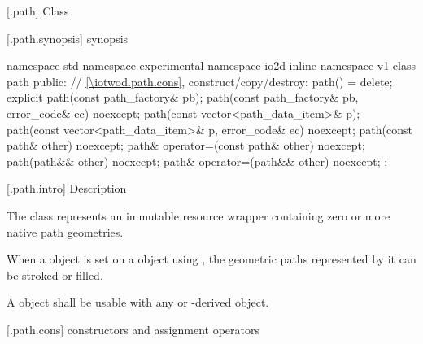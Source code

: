  [\iotwod.path] {Class }

 [\iotwod.path.synopsis] { synopsis}

\begin{codeblock}
namespace std { namespace experimental { namespace io2d { inline namespace v1 {
  class path {
    public:
    // \ref{\iotwod.path.cons}, construct/copy/destroy:
    path() = delete;
    explicit path(const path_factory& pb);
    path(const path_factory& pb, error_code& ec) noexcept;
    path(const vector<path_data_item>& p);
    path(const vector<path_data_item>& p, error_code& ec) noexcept;
    path(const path& other) noexcept;
    path& operator=(const path& other) noexcept;
    path(path&& other) noexcept;
    path& operator=(path&& other) noexcept;
  };
} } } }
\end{codeblock}

 [\iotwod.path.intro] { Description}

\pnum
{}
The  class represents an immutable resource wrapper containing zero or more native path geometries.

\pnum
When a  object is set on a  object using 
, the geometric paths represented by it can be 
stroked or filled.

\pnum
A  object shall be usable with any  or -derived object.

 [\iotwod.path.cons] { constructors and assignment operators}

